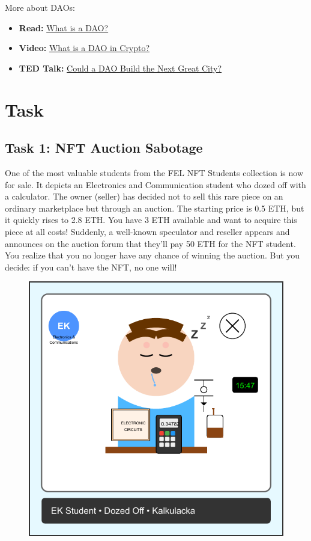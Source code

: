 \documentclass[12pt]{article}
\begin{document}
\medskip
\noindent
More about DAOs:
\begin{itemize}
    \item \textbf{Read:} \href{https://ethereum.org/dao/#what-are-daos}{What is a DAO?}
    \item \textbf{Video:} \href{https://www.youtube.com/watch?v=KHm0uUPqmVE}{What is a DAO in Crypto?}
    \item \textbf{TED Talk:} \href{https://www.youtube.com/watch?v=zTStDvUtQWc}{Could a DAO Build the Next Great City?}
\end{itemize}

\section{Task}

\subsection*{Task 1: NFT Auction Sabotage}

One of the most valuable students from the FEL NFT Students collection is now
for sale. It depicts an Electronics and Communication student who dozed off with a
calculator. The owner (seller) has decided not to sell this rare piece on an
ordinary marketplace but through an auction. The starting price is 0.5 ETH,
but it quickly rises to 2.8 ETH. You have 3 ETH available and want to acquire
this piece at all costs! Suddenly, a well-known speculator and reseller appears
and announces on the auction forum that they'll pay 50 ETH for the NFT student.
You realize that you no longer have any chance of winning the auction. But you
decide: if you can't have the NFT, no one will!

\begin{figure}[h!]
    \centering
    \begin{minipage}{0.3\textwidth}
        \includegraphics[width=\textwidth]{NFTs/ek-student-nft.pdf}
    \end{minipage}
\end{figure}
\end{document}
